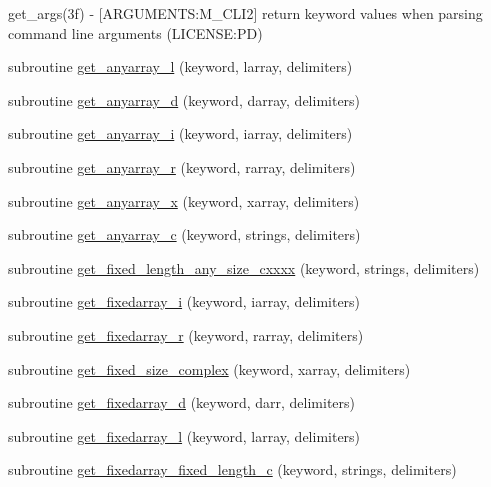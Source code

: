 \begin{DoxyCompactItemize}
\begin{DoxyCompactList}
get\+\_\+args(3f) -\/ \mbox{[}A\+R\+G\+U\+M\+E\+N\+TS\+:M\+\_\+\+C\+L\+I2\mbox{]} return keyword values when parsing command line arguments (L\+I\+C\+E\+N\+SE\+:PD) \end{DoxyCompactList}\item 
subroutine \mbox{\hyperlink{namespacem__cli2_a47cc758d20b655bc21672c31289e54ce}{get\+\_\+anyarray\+\_\+l}} (keyword, larray, delimiters)
\item 
subroutine \mbox{\hyperlink{namespacem__cli2_aaede1f28172778cf45f4b6c04967bbbd}{get\+\_\+anyarray\+\_\+d}} (keyword, darray, delimiters)
\item 
subroutine \mbox{\hyperlink{namespacem__cli2_ad314315dd5c93abff5168265f5ff0e4e}{get\+\_\+anyarray\+\_\+i}} (keyword, iarray, delimiters)
\item 
subroutine \mbox{\hyperlink{namespacem__cli2_a8f1d5223b075f23d513c94548a1ebf09}{get\+\_\+anyarray\+\_\+r}} (keyword, rarray, delimiters)
\item 
subroutine \mbox{\hyperlink{namespacem__cli2_ab9ab288fa5f108beeb7c94d81b223b7c}{get\+\_\+anyarray\+\_\+x}} (keyword, xarray, delimiters)
\item 
subroutine \mbox{\hyperlink{namespacem__cli2_a448e8e24406f4bdbc14f26a940cbbc2c}{get\+\_\+anyarray\+\_\+c}} (keyword, strings, delimiters)
\item 
subroutine \mbox{\hyperlink{namespacem__cli2_abc31389c45dcd95b8db641b59b98b447}{get\+\_\+fixed\+\_\+length\+\_\+any\+\_\+size\+\_\+cxxxx}} (keyword, strings, delimiters)
\item 
subroutine \mbox{\hyperlink{namespacem__cli2_aa469ba94e6bb122c9bf30dd8642b693b}{get\+\_\+fixedarray\+\_\+i}} (keyword, iarray, delimiters)
\item 
subroutine \mbox{\hyperlink{namespacem__cli2_afbec790abad0dca990c0a61cd2d9e9ae}{get\+\_\+fixedarray\+\_\+r}} (keyword, rarray, delimiters)
\item 
subroutine \mbox{\hyperlink{namespacem__cli2_a32b78784e20e29bf40f17e16d08336fa}{get\+\_\+fixed\+\_\+size\+\_\+complex}} (keyword, xarray, delimiters)
\item 
subroutine \mbox{\hyperlink{namespacem__cli2_a2c8db0f383888cb2b3ce8643de3fae93}{get\+\_\+fixedarray\+\_\+d}} (keyword, darr, delimiters)
\item 
subroutine \mbox{\hyperlink{namespacem__cli2_a65ffe8c7a444db5db3be3f6edecef008}{get\+\_\+fixedarray\+\_\+l}} (keyword, larray, delimiters)
\item 
subroutine \mbox{\hyperlink{namespacem__cli2_a8000c5e05f6c84ba17350d4a00850a6a}{get\+\_\+fixedarray\+\_\+fixed\+\_\+length\+\_\+c}} (keyword, strings, delimiters)

\end{DoxyCompactItemize}
